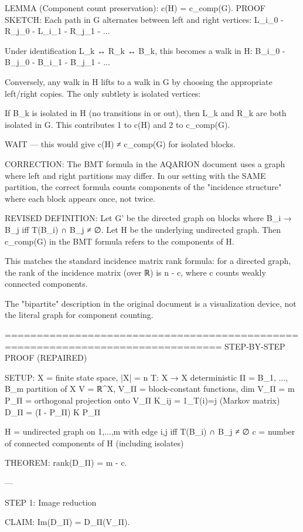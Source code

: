 LEMMA (Component count preservation): c(H) = c_comp(G).
PROOF SKETCH:
Each path in G alternates between left and right vertices:
L_{i_0} - R_{j_0} - L_{i_1} - R_{j_1} - ...

Under identification L_k ↔ R_k ↔ B_k, this becomes a walk in H:
B_{i_0} - B_{j_0} - B_{i_1} - B_{j_1} - ...

Conversely, any walk in H lifts to a walk in G by choosing the appropriate
left/right copies. The only subtlety is isolated vertices:

If B_k is isolated in H (no transitions in or out), then L_k and R_k are
both isolated in G. This contributes 1 to c(H) and 2 to c_comp(G).


WAIT — this would give c(H) ≠ c_comp(G) for isolated blocks.

CORRECTION: The BMT formula in the AQARION document uses a graph where
left and right partitions may differ. In our setting with the SAME partition,
the correct formula counts components of the "incidence structure" where
each block appears once, not twice.

REVISED DEFINITION: Let G' be the directed graph on blocks where
B_i → B_j iff T(B_i) ∩ B_j ≠ ∅. Let H be the underlying undirected graph.
Then c_comp(G) in the BMT formula refers to the components of H.

This matches the standard incidence matrix rank formula: for a directed
graph, the rank of the incidence matrix (over ℝ) is n - c, where c counts
weakly connected components.

The "bipartite" description in the original document is a visualization
device, not the literal graph for component counting.

================================================================================
STEP-BY-STEP PROOF (REPAIRED)

SETUP:
X = finite state space, |X| = n
T: X → X deterministic
Π = {B_1, ..., B_m} partition of X
V = ℝ^X, V_Π = block-constant functions, dim V_Π = m
P_Π = orthogonal projection onto V_Π
K_{ij} = 1_{T(i)=j} (Markov matrix)
D_Π = (I - P_Π) K P_Π

H = undirected graph on {1,...,m} with edge {i,j} iff T(B_i) ∩ B_j ≠ ∅
c = number of connected components of H (including isolates)

THEOREM: rank(D_Π) = m - c.


---

STEP 1: Image reduction

CLAIM: Im(D_Π) = D_Π(V_Π).

